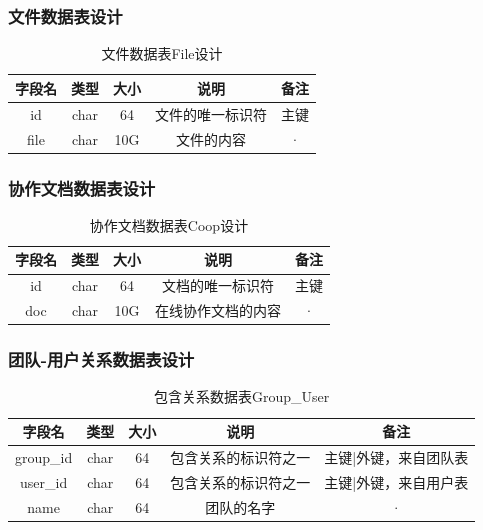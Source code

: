 \subsubsection{文件数据表设计}
\begin{table}[htbp]
\centering
\caption{文件数据表File设计} \label{tab:order-database}
\begin{tabular}{|c|c|c|c|c|}
    \hline
    字段名 & 类型 & 大小 & 说明 & 备注 \\
    \hline
    id & char & 64 & 文件的唯一标识符 & 主键\\
    \hline
    file & char & 10G & 文件的内容 & · \\
    \hline
\end{tabular}
\end{table}
\subsubsection{协作文档数据表设计}
\begin{table}[htbp]
\centering
\caption{协作文档数据表Coop设计} \label{tab:order-database}
\begin{tabular}{|c|c|c|c|c|}
    \hline
    字段名 & 类型 & 大小 & 说明 & 备注 \\
    \hline
    id & char & 64 & 文档的唯一标识符 & 主键\\
    \hline
    doc & char & 10G & 在线协作文档的内容 & · \\
    \hline
\end{tabular}
\end{table}
\subsubsection{团队-用户关系数据表设计}
\begin{table}[htbp]
\centering
\caption{包含关系数据表Group\_User} \label{tab:order-database}
\begin{tabular}{|c|c|c|c|c|}
    \hline
    字段名 & 类型 & 大小 & 说明 & 备注 \\
    \hline
    group\_id & char & 64 & 包含关系的标识符之一 & 主键|外键，来自团队表
    \\
    \hline
    user\_id & char & 64 & 包含关系的标识符之一 & 主键|外键，来自用户表 \\
    \hline
    name & char & 64 & 团队的名字 & · \\
    \hline
\end{tabular}
\end{table}
